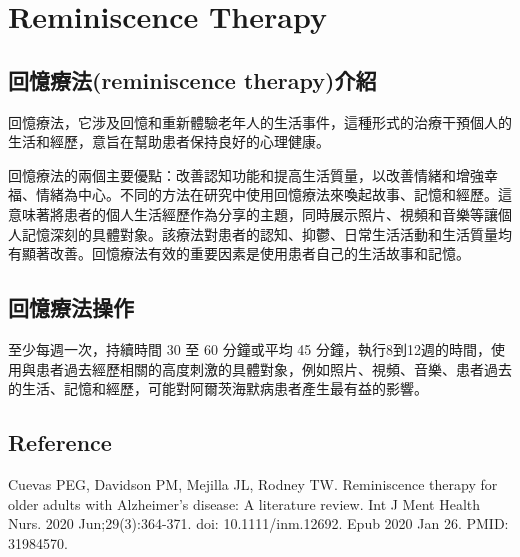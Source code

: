 \chapter{Reminiscence Therapy}
\label{chapter:intro}
\section{回憶療法(reminiscence therapy)介紹}
回憶療法，它涉及回憶和重新體驗老年人的生活事件，這種形式的治療干預個人的生活和經歷，意旨在幫助患者保持良好的心理健康。

回憶療法的兩個主要優點：改善認知功能和提高生活質量，以改善情緒和增強幸福、情緒為中心。不同的方法在研究中使用回憶療法來喚起故事、記憶和經歷。這意味著將患者的個人生活經歷作為分享的主題，同時展示照片、視頻和音樂等讓個人記憶深刻的具體對象。該療法對患者的認知、抑鬱、日常生活活動和生活質量均有顯著改善。回憶療法有效的重要因素是使用患者自己的生活故事和記憶。

\section{回憶療法操作}
至少每週一次，持續時間 30 至 60 分鐘或平均 45 分鐘，執行8到12週的時間，使用與患者過去經歷相關的高度刺激的具體對象，例如照片、視頻、音樂、患者過去的生活、記憶和經歷，可能對阿爾茨海默病患者產生最有益的影響。

\section{Reference}

Cuevas PEG, Davidson PM, Mejilla JL, Rodney TW. Reminiscence therapy for older adults with Alzheimer's disease: A literature review. Int J Ment Health Nurs. 2020 Jun;29(3):364-371. doi: 10.1111/inm.12692. Epub 2020 Jan 26. PMID: 31984570.